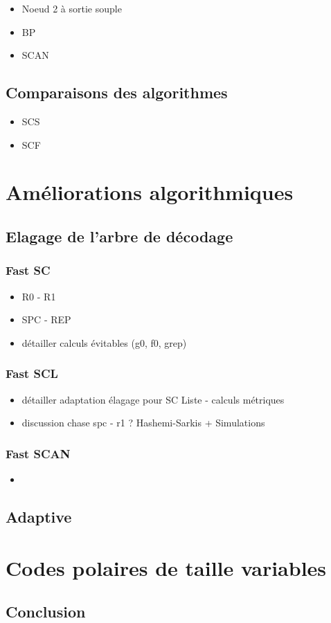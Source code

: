 \begin{itemize}
\item Noeud 2 à sortie souple
\item BP
\item SCAN
\end{itemize}


\subsection{Comparaisons des algorithmes}
\begin{itemize}
	\item SCS
	\item SCF
\end{itemize}

\section{Améliorations algorithmiques}

\subsection{Elagage de l'arbre de décodage}

\subsubsection{Fast SC}
\begin{itemize}
\item R0 - R1
\item SPC - REP
\item détailler calculs évitables (g0, f0, grep)
\end{itemize}
\subsubsection{Fast SCL}
\begin{itemize}
\item détailler adaptation élagage pour SC Liste - calculs métriques
\item discussion chase spc - r1 ? Hashemi-Sarkis + Simulations
\end{itemize}
\subsubsection{Fast SCAN}
\begin{itemize}
\item 
\end{itemize}

\subsection{Adaptive}

\section{Codes polaires de taille variables}


\subsection*{Conclusion}
